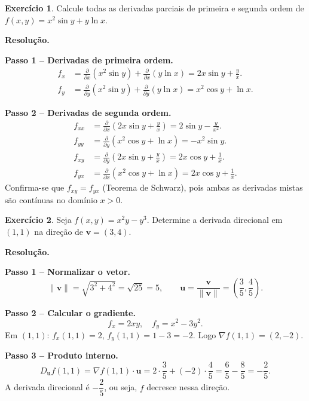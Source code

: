 \documentclass[12pt,a4paper]{article}
\theoremstyle{definition}
\newtheorem{exercise}{Exercício}[section]
\theoremstyle{remark}
\begin{document}
\begin{exercise}
  Calcule todas as derivadas parciais de primeira e segunda ordem de
  $f(x,y) = x^2\sin y + y\ln x$.

  \medskip\textbf{Resolução.}

  \textbf{Passo 1 -- Derivadas de primeira ordem.}
  \begin{align*}
    f_x &= \frac{\partial}{\partial x}(x^2\sin y) + \frac{\partial}{\partial x}(y\ln x)
         = 2x\sin y + \frac{y}{x}.\\[4pt]
    f_y &= \frac{\partial}{\partial y}(x^2\sin y) + \frac{\partial}{\partial y}(y\ln x)
         = x^2\cos y + \ln x.
  \end{align*}

  \textbf{Passo 2 -- Derivadas de segunda ordem.}
  \begin{align*}
    f_{xx} &= \frac{\partial}{\partial x}\!\left(2x\sin y+\frac{y}{x}\right)
            = 2\sin y - \frac{y}{x^2}.\\[4pt]
    f_{yy} &= \frac{\partial}{\partial y}(x^2\cos y+\ln x)
            = -x^2\sin y.\\[4pt]
    f_{xy} &= \frac{\partial}{\partial y}\!\left(2x\sin y+\frac{y}{x}\right)
            = 2x\cos y + \frac{1}{x}.\\[4pt]
    f_{yx} &= \frac{\partial}{\partial x}(x^2\cos y+\ln x)
            = 2x\cos y + \frac{1}{x}.
  \end{align*}
  Confirma-se que $f_{xy}=f_{yx}$ (Teorema de Schwarz), pois ambas as
  derivadas mistas são contínuas no domínio $x>0$.
\end{exercise}

\begin{exercise}
  Seja $f(x,y) = x^2 y - y^3$. Determine a derivada direcional em $(1,1)$
  na direção de $\mathbf{v}=(3,4)$.

  \medskip\textbf{Resolução.}

  \textbf{Passo 1 -- Normalizar o vetor.}
  \[
    \|\mathbf{v}\| = \sqrt{3^2+4^2} = \sqrt{25} = 5,\qquad
    \mathbf{u} = \frac{\mathbf{v}}{\|\mathbf{v}\|} = \left(\frac{3}{5},\frac{4}{5}\right).
  \]

  \textbf{Passo 2 -- Calcular o gradiente.}
  \[
    f_x = 2xy,\quad f_y = x^2 - 3y^2.
  \]
  Em $(1,1)$: $f_x(1,1)=2$, $f_y(1,1)=1-3=-2$.
  Logo $\nabla f(1,1)=(2,-2)$.

  \textbf{Passo 3 -- Produto interno.}
  \[
    D_{\mathbf{u}}f(1,1) = \nabla f(1,1)\cdot\mathbf{u}
    = 2\cdot\frac{3}{5}+(-2)\cdot\frac{4}{5}
    = \frac{6}{5}-\frac{8}{5} = -\frac{2}{5}.
  \]
  A derivada direcional é $-\dfrac{2}{5}$, ou seja, $f$ decresce nessa
  direção.
\end{exercise}
\end{document}
